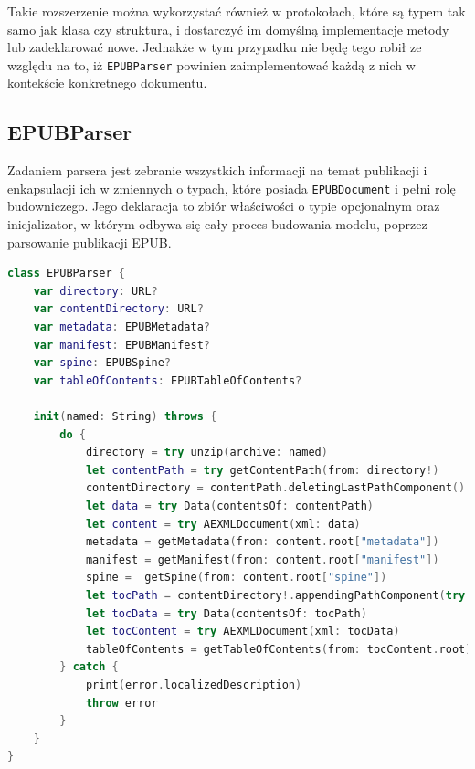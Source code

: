 Takie rozszerzenie można wykorzystać również w protokołach, które są typem tak samo jak klasa czy struktura, i dostarczyć im domyślną implementacje metody lub zadeklarować nowe. Jednakże w tym przypadku nie będę tego robił ze względu na to, iż \texttt{EPUBParser} powinien zaimplementować każdą z nich w kontekście konkretnego dokumentu.

\subsection{EPUBParser}

Zadaniem parsera jest zebranie wszystkich informacji na temat publikacji i enkapsulacji ich w zmiennych o typach, które posiada \texttt{EPUBDocument} i pełni rolę budowniczego. Jego deklaracja to zbiór właściwości o typie opcjonalnym oraz inicjalizator, w którym odbywa się cały proces budowania modelu, poprzez parsowanie publikacji EPUB.

\begin{lstlisting}[caption={Klasa EPUBParser}, language=swift,label=fsdfsrteytrv]
class EPUBParser {
    var directory: URL?
    var contentDirectory: URL?
    var metadata: EPUBMetadata?
    var manifest: EPUBManifest?
    var spine: EPUBSpine?
    var tableOfContents: EPUBTableOfContents?

    init(named: String) throws {
        do {
            directory = try unzip(archive: named)
            let contentPath = try getContentPath(from: directory!)
            contentDirectory = contentPath.deletingLastPathComponent()
            let data = try Data(contentsOf: contentPath)
            let content = try AEXMLDocument(xml: data)
            metadata = getMetadata(from: content.root["metadata"])
            manifest = getManifest(from: content.root["manifest"])
            spine =  getSpine(from: content.root["spine"])
            let tocPath = contentDirectory!.appendingPathComponent(try manifest!.path(forItemWithId: spine?.toc ?? ""))
            let tocData = try Data(contentsOf: tocPath)
            let tocContent = try AEXMLDocument(xml: tocData)
            tableOfContents = getTableOfContents(from: tocContent.root)
        } catch {
            print(error.localizedDescription)
            throw error
        }
    }
}
\end{lstlisting}


